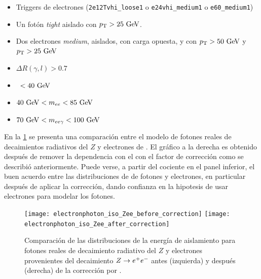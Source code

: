 \begin{itemize}\itemsep0.1cm
\item Triggers de electrones (\texttt{2e12Tvhi\_loose1} o \texttt{e24vhi\_medium1} o \texttt{e60\_medium1})
\item Un fotón \emph{tight} aislado con $\pt>25 \gev$.
\item Dos electrones \emph{medium}, aislados, con carga opuesta, y con $\pt>50 \gev$ y $\pt>25 \gev$
\item $\Delta R(\gamma,l)>0.7$
\item \MET\ $<40\gev$
\item $40\gev<m_{ee}<85\gev$
\item $70\gev<m_{ee\gamma}<100\gev$
\end{itemize}

En la \cref{fig:photon_electron_iso} se presenta una comparación entre el modelo
de fotones reales de decaimientos radiativos del $Z$ y electrones de {\Zee}. El
gráfico a la derecha es obtenido después de remover la dependencia con el {\pt}
con el factor de corrección como se describió anteriormente. Puede verse, a partir
del cociente en el panel inferior,
el buen acuerdo entre las distribuciones de {\etiso} de fotones y
electrones, en particular después de aplicar la corrección, dando confianza en la
hipotesis de usar electrones para modelar los fotones.


\begin{figure}[!htbp]
  \centering

  \texttt{[image: electronphoton\_iso\_Zee\_before\_correction]}
  \texttt{[image: electronphoton\_iso\_Zee\_after\_correction]}

  \caption{Comparación de las distribuciones de la energía de aislamiento para fotones reales de
    decaimiento radiativo del $Z$ y electrones provenientes del decaimiento $Z \rightarrow e^+ e^-$ antes (izquierda)
    y después (derecha) de la corrección por \pt.}
    \label{fig:photon_electron_iso}

\end{figure}



